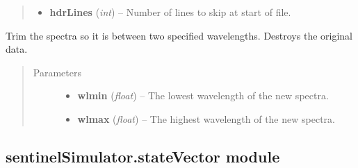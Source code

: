 \documentclass[letterpaper,10pt,english]{sphinxmanual}
\begin{document}
\begin{fulllineitems}
\begin{fulllineitems}
\begin{quote}
\begin{description}
\begin{itemize}
\item {} 
\textbf{hdrLines} (\emph{int}) -- Number of lines to skip at start of file.

\end{itemize}

\end{description}\end{quote}

\end{fulllineitems}


\begin{fulllineitems}
\label{source/sentinelSimulator:sentinelSimulator.spectra.spectra.trim}
Trim the spectra so it is between two specified wavelengths. Destroys the original data.
\begin{quote}\begin{description}
\item[{Parameters}] \leavevmode\begin{itemize}
\item {} 
\textbf{wlmin} (\emph{float}) -- The lowest wavelength of the new spectra.

\item {} 
\textbf{wlmax} (\emph{float}) -- The highest wavelength of the new spectra.

\end{itemize}

\end{description}\end{quote}

\end{fulllineitems}


\end{fulllineitems}



\subsection{sentinelSimulator.stateVector module}
\label{source/sentinelSimulator:module-sentinelSimulator.stateVector}\label{source/sentinelSimulator:sentinelsimulator-statevector-module}
\end{document}
